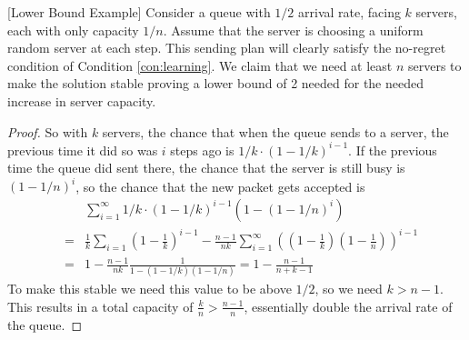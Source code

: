 \begin{theorem}\label{thm:lower-bound-example} [Lower Bound Example]
Consider a queue with $1/2$ arrival rate, facing $k$ servers, each with only capacity $1/n$. Assume that the server is choosing a uniform random server at each step. This sending plan will clearly satisfy the no-regret condition of Condition \ref{con:learning}. We claim that we need at least $n$ servers to make the solution stable proving a lower bound of 2 needed for the needed increase in server capacity. 
\end{theorem}
\begin{proof}
So with $k$ servers, the chance that when the queue sends to a server, the previous time it did so was $i$ steps ago is $1/k \cdot (1-1/k)^{i-1}$. If the previous time the queue did sent there, the chance that the server is still busy is $(1-1/n)^i$, so the chance that the new packet gets accepted is
\begin{eqnarray*}
&& \sum_{i=1}^{\infty}    1/k \cdot (1-1/k)^{i-1} (1-(1-1/n)^i)\\
&=& \frac{1}{k}\sum_{i=1} (1-\frac{1}{k})^{i-1}-\frac{n-1}{nk}\sum_{i=1}^{\infty} ((1-\frac{1}{k})(1-\frac{1}{n}))^{i-1}\\
&=& 1-\frac{n-1}{nk}\frac{1}{1-(1-1/k)(1-1/n)}
=1-\frac{n-1}{n+k-1}
\end{eqnarray*}
To make this stable we need this value to be above $1/2$, so we need %
$k>n-1$. This results in a total capacity of $\frac{k}{n}>\frac{n-1}{n}$, essentially double the arrival rate of the queue.
\end{proof}

